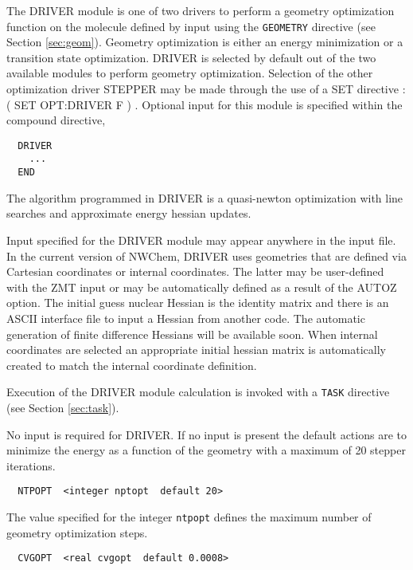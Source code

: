 \label{sec:driver}

The DRIVER module is one of two drivers to perform a geometry
optimization function on the molecule defined by input using the
\verb+GEOMETRY+ directive (see Section \ref{sec:geom}).  Geometry
optimization is either an energy minimization or a transition state
optimization. DRIVER is selected by default out of the two available
modules to perform geometry optimization.  Selection of the other
optimization driver STEPPER may be made through the use of a SET
directive : ( SET OPT:DRIVER F ) .  Optional input for this module is
specified within the compound directive,

\begin{verbatim}
  DRIVER 
    ...
  END
\end{verbatim}

The algorithm programmed in DRIVER is a quasi-newton optimization
with line searches and approximate energy hessian updates.

Input specified for the DRIVER module may appear anywhere in the input
file.  In the current version of NWChem, DRIVER uses  geometries that
are defined via Cartesian coordinates or internal coordinates. The
latter may be user-defined with the ZMT input or may be automatically
defined as a result of the AUTOZ option.  The initial guess nuclear
Hessian is the identity matrix and there is an ASCII interface file to
input a Hessian from another code.  The automatic generation of finite
difference Hessians will be available soon. When internal coordinates
are selected an appropriate initial hessian matrix is automatically
created to match the internal coordinate definition.

Execution of the DRIVER module calculation is invoked with a
\verb+TASK+ directive (see Section \ref{sec:task}).

No input is required for DRIVER.  If no input is present the default
actions are to minimize the energy as a function of the geometry with a
maximum of 20 stepper iterations.

\begin{verbatim}
  NTPOPT  <integer nptopt  default 20>
\end{verbatim}

The value specified for the integer \verb+ntpopt+ defines the maximum 
number of geometry optimization steps.  

\begin{verbatim}
  CVGOPT  <real cvgopt  default 0.0008>
\end{verbatim}
 
